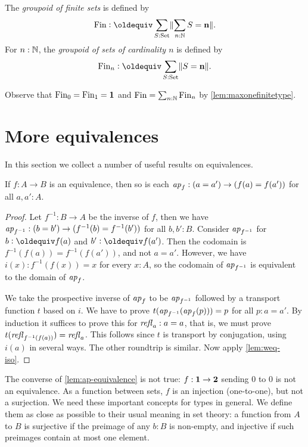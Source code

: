 \begin{definition}
\begin{definition}\label{def:groupoidFin}
The \emph{groupoid of finite sets} is defined by
\[
\fin\defeq\sum_{S:\Set}\Trunc{\sum_{n:\NN}S=\bn{n}}.
\]
For $n:\mathbb{N}$, the \emph{groupoid of sets of cardinality $n$} is defined by
\[
\fin_n\defequi \sum_{S:\Set}\Trunc{S=\bn{n}}.
\]
\end{definition}
Observe that $\operatorname{Fin}_0=\operatorname{Fin}_1=\mathbf{1} $ and $\operatorname{Fin}=\sum_{n:\mathbb{N}}\operatorname{Fin}_n$
by \cref{lem:maxonefinitetype}.

\section{More equivalences}
\label{sec:more-on-equivalences}

In this section we collect a number of useful results on equivalences.

\begin{lemma}\label{lem:ap-equivalence}
If $f:A\to B$ is an equivalence, then so is each 
$\mathop{{\it ap}_{f}}: (a=a') \to (f(a)=f(a'))$ for all $a,a':A$.
\end{lemma}
\begin{proof}
Let $f^{-1} : B\to A$ be the inverse of $f$, then we have 
$\mathop{{\it ap}_{f^{-1}}}: (b=b') \to (f^{-1}(b)=f^{-1}(b'))$ for all $b,b':B$.
Consider $\mathop{{\it ap}_{f^{-1}}}$ for $b\defeq f(a)$ and $b'\defeq f(a')$.
Then the codomain is $f^{-1}(f(a))=f^{-1}(f(a'))$, and not $a=a'$.
However, we have $i(x):f^{-1}(f(x))=x$ for every $x:A$, so the 
codomain of $\mathop{{\it ap}_{f^{-1}}}$ is equivalent to the domain of $\mathop{{\it ap}_{f}}$.

We take the prospective inverse of $\mathop{{\it ap}_{f}}$ to be $\mathop{{\it ap}_{f^{-1}}}$
followed by a transport function $t$ based on $i$. 
We have to prove $t(\mathop{{\it ap}_{f^{-1}}}(\mathop{{\it ap}_{f}}(p)))=p$ for all $p:a=a'$.
By induction it suffices to prove this for $\mathop{{\it refl}_{a}}:a=a$,
that is, we must prove $t(\mathop{{\it refl}_{f^{-1}(f(a))}})=\mathop{{\it refl}_{a}}$.
This follows since $t$ is transport by conjugation,
using $i(a)$ in several ways. The other roundtrip is similar.
Now apply \cref{lem:weq-iso}.
\end{proof}

The converse of \cref{lem:ap-equivalence} is not
true: $f:\mathbf{1}\to\mathbf{2}$ sending $0$ to $0$ is not an
equivalence. As a function between sets,
$f$ is an injection (one-to-one), but not a surjection.
We need these important concepts for types in general.
We define them as close as possible to their
usual meaning in set theory: a function from $A$ to $B$ is 
surjective if the preimage of any $b:B$ is non-empty,
and injective if such preimages contain at most one element.


\end{definition}
